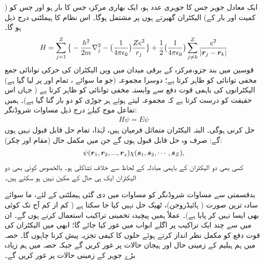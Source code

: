 ایک معادل جوہر جس کا جوہری عدد  ہو، ایک بھاری مرکزہ جس کا بار   ہو اور جس کو   ( کمیت    اور بار  کے)   الیکٹران گھیرتے  ہوں پر مشتمل ہوگا۔ اس نظام کا ہیملٹنی درج ذیل ہو گا۔
\begin{align}\label{مساوات_متماثل_ہیملٹنی_جوہر_عمومی}
H=\sum_{j=1}^{Z} \big\{ -\frac{h^2}{2m}\nabla_j^2-\big(\frac{1}{4\pi\epsilon_{0}}\big)  \frac{Ze^2}{r_{j}} \big\} + \frac{1}{2}\big(\frac{1}{4\pi\epsilon_{0}}\big) \sum_{j\ne  k}^{Z} \frac{e^2}{|{{\boldsymbol{r}}}_{j} - {{\boldsymbol{r}}}_{k} |}
\end{align}
 قوسین میں بند جزو،مرکزہ کے برقی میدان میں  ویں  الیکٹران کی حرکی توانائی جمع مخفی توانائی کو ظاہر کرتا ہے؛  دوسرا  مجموعہ   (جو  ما سوائے ،  تمام  اور  پر   لیا گیا ہے)   الیکٹرانوں کی  باہمی قوت دفع  سے وابستہ مخفی   توانائی کو ظاہر کرتا ہے ( جہاں  اس حقیقت کو درست کرتا ہے کہ مجموعہ لیتے ہوئے ہر جوڑی کو دو بار گنا  گیا ہے)۔ ہمیں 
 تفاعل موج  کیلۓ درج ذیل مساوات شروڈنگر:
\begin{align}\label{مساوات_متماثل_شروڈنگر_عمومی_جوہر}
 H\psi=E\psi
\end{align}
 حل کرنی ہوگی۔ البتہ  الیکٹران متماثل فرمیان ہیں، لہٰذا،  تمام حل قابل قبول نہیں ہوں گے: صرف وہ حل قابل قبول ہوں گے جن میں  مکمل حال  (مقام اور چکر):
\begin{align}
 \psi({{\boldsymbol{r}}}_{1},{{\boldsymbol{r}}}_{2},...,{{\boldsymbol{r}}}_{z}) \chi({{\boldsymbol{s}}}_{1},{{\boldsymbol{s}}}_{2},\cdots,{{\boldsymbol{s}}}_{Z}), 
\end{align}
کسی بھی دو الیکٹران کے باہمی مبادلہ کے لحاظ سے خلاف تشاکلی ہو۔ بالخصوص کوئی بھی دو الیکٹران ایک ہی حال کے مکین نہیں ہو سکتے ہیں۔

 بدقسمتی سے مساوات شروڈنگر کو مساوات  میں دی گئی ہیملٹنی کے لئے،   ما سوائے سادہ ترین صورت (  ہائیڈروجن)،    ٹھیک حل نہیں کیا جا سکتا ہے ( کم از کم آج تک کوئی بھی ایسا نہیں کر پایا ہے)۔ عملاً ہمیں  پیچیدہ تخمینی تراکیب استعمال کرنے ہوں گے۔ ان میں سے چند ایک تراکیب پر اگلے ابواب  میں غور کیا جائے گا؛  ابھی میں الیکٹران کی قوت دفع کو مکمل  نظر انداز کرتے ہوئے حلوں کا کیفی تجزیہ پیش کرنا چاہوں گا۔ حصہ    میں ہم ہیلیم کے  زمینی حال اور ہیجان  حالات پر غور کریں گے  جبکہ حصہ   میں ہم زیادہ بڑے  جوہر  کے زمینی حالات پر غور کریں گے۔

